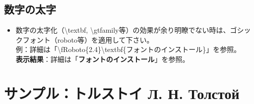 \documentclass[a4paper,10pt]{ltjsarticle}
\def\colH#1{\color[HTML]{#1}}
\def\bs{\textbackslash }
\begin{document}
\subsection{数字の太字}

\begin{itemize}
   \item 数字の太字化（\bs textbf, \bs gtfamily等）の効果が余り明瞭でない時は、ゴシックフォント（roboto等）を適用して下さい。\\
   例：詳細は「{\colH{800000}\bs fRoboto\{}2.4{\colH{800000}\}}\bs textbf\{フォントのインストール\}」を参照。\\
    \textbf{表示結果}：詳細は「\textbf{フォントのインストール}」を参照。
\end{itemize}
\section{サンプル：トルストイ  {\fCRoman Л. Н. Толстой}}
  
\end{document}
